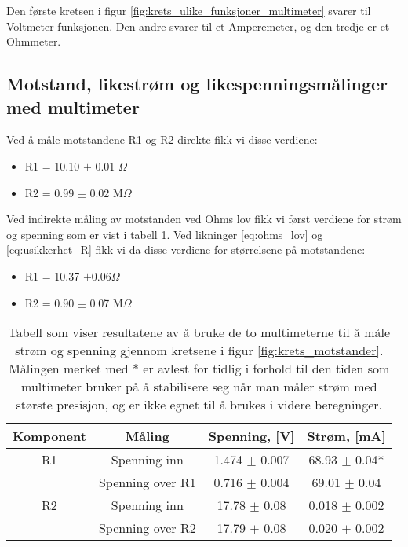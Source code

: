 \documentclass[reprint, english,notitlepage]{revtex4-1}  %
\begin{document}
Den første kretsen i figur \ref{fig:krets_ulike_funksjoner_multimeter} svarer til Voltmeter-funksjonen. Den andre svarer til et Amperemeter, og den tredje er et Ohmmeter.


\subsection{Motstand, likestrøm og likespenningsmålinger med multimeter}
Ved å måle motstandene R1 og R2 direkte fikk vi disse verdiene:
\begin{itemize}
  \item R1 = 10.10 $\pm$ 0.01 $\Omega$
  \item R2 = 0.99 $\pm$ 0.02 M$\Omega$
\end{itemize}

Ved indirekte måling av motstanden ved Ohms lov fikk vi først verdiene for strøm og spenning som er vist i tabell \ref{table:motstander}. Ved likninger \ref{eq:ohms_lov} og \ref{eq:usikkerhet_R} fikk vi da disse verdiene for størrelsene på motstandene:
\begin{itemize}
  \item R1 = 10.37 $\pm 0.06 \Omega$
  \item R2 = 0.90 $\pm$ 0.07 M$\Omega$
\end{itemize}

\begin{table}[p]
\label{table:motstander}
\caption{Tabell som viser resultatene av å bruke de to multimeterne til å måle strøm og spenning gjennom kretsene i figur \ref{fig:krets_motstander}. Målingen merket med * er avlest for tidlig i forhold til den tiden som multimeter bruker på å stabilisere seg når man måler strøm med største presisjon, og er ikke egnet til å brukes i videre beregninger.}

\begin{adjustbox}{width=\linewidth}
\begin{tabular}{||c || c | c | c||}
\hline
Komponent & Måling & Spenning, [V] & Strøm, [mA]   \\ \hline\hline
R1 & Spenning inn     & 1.474 $\pm$ 0.007 & 68.93 $\pm$ 0.04*   \\ \hline
   & Spenning over R1 & 0.716 $\pm$ 0.004 & 69.01 $\pm$ 0.04    \\ \hline
R2 & Spenning inn     & 17.78 $\pm$ 0.08  & 0.018 $\pm$ 0.002   \\ \hline
   & Spenning over R2 & 17.79 $\pm$ 0.08  & 0.020 $\pm$ 0.002   \\ \hline
\end{tabular}
\end{adjustbox}
\end{table}
\end{document}
